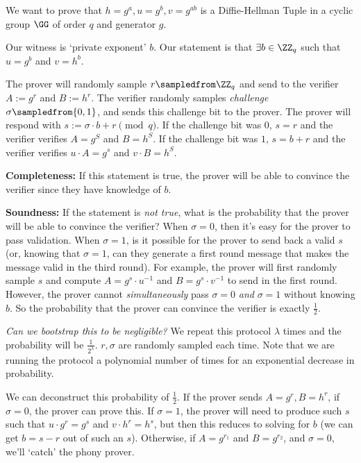 \begin{example}
    We want to prove that $h = g^a, u = g^b, v = g^{ab}$ is a Diffie-Hellman Tuple in a cyclic group $\GG$ of order $q$ and generator $g$.

    Our witness is `private exponent' $b$. Our statement is that $\exists b\in \ZZ_q$ such that $u = g^b$ and $v = h^b$.


    The prover will randomly sample $r\sampledfrom \ZZ_q$ and send to the verifier $A:=g^r$ and $B:=h^r$. The verifier randomly samples \emph{challenge} $\sigma \sampledfrom \{0, 1\}$, and sends this challenge bit to the prover. The prover will respond with $s := \sigma\cdot b + r\pmod{q}$. If the challenge bit was $0$, $s = r$ and the verifier verifies $A = g^S$ and $B = h^S$. If the challenge bit was $1$, $s = b + r$ and the verifier verifies $u\cdot A = g^s$ and $v\cdot B = h^S$.

    \textbf{Completeness:} If this statement is true, the prover will be able to convince the verifier since they have knowledge of $b$.

    \textbf{Soundness:} If the statement is \emph{not true}, what is the probability that the prover will be able to convince the verifier? When $\sigma = 0$, then it's easy for the prover to pass validation. When $\sigma = 1$, is it possible for the prover to send back a valid $s$ (or, knowing that $\sigma = 1$, can they generate a first round message that makes the message valid in the third round). For example, the prover will first randomly sample $s$ and compute $A = g^s\cdot u^{-1}$ and $B = g^s\cdot v^{-1}$ to send in the first round. However, the prover cannot \emph{simultaneously} pass $\sigma = 0$ \emph{and} $\sigma = 1$ without knowing $b$. So the probability that the prover can convince the verifier is exactly $\frac{1}{2}$.

    \emph{Can we bootstrap this to be negligible?} We repeat this protocol $\lambda$ times and the probability will be $\frac{1}{2^\lambda}$. $r, \sigma$ are randomly sampled each time. Note that we are running the protocol a polynomial number of times for an exponential decrease in probability.
\end{example}

We can deconstruct this probability of $\frac{1}{2}$. If the prover sends $A = g^r, B = h^r$, if $\sigma = 0$, the prover can prove this. If $\sigma = 1$, the prover will need to produce such $s$ such that $u\cdot g^r = g^s$ and $v\cdot h^r = h^s$, but then this reduces to solving for $b$ (we can get $b = s-r$ out of such an $s$). Otherwise, if $A = g^{r_1}$ and $B = g^{r_2}$, and $\sigma = 0$, we'll `catch' the phony prover.

